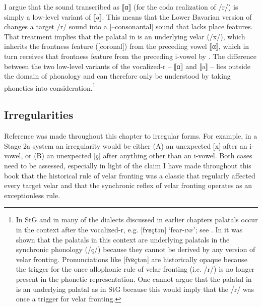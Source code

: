 I argue that the sound transcribed as ⟦α⟧ (for the coda realization of /r/) is simply a low-level variant of ⟦ə⟧. This means that the Lower Bavarian version of  changes a target /r/ sound into a [--consonantal] sound that lacks place features. That treatment implies that the palatal in  is an underlying velar (/x/), which inherits the frontness feature ([coronal]) from the preceding vowel ⟦α⟧, which in turn receives that frontness feature from the preceding i-vowel by . The difference between the two low-level variants of the vocalized-r -- ⟦α⟧ and ⟦ə⟧ -- lies outside the domain of phonology and can therefore only be understood by taking phonetics into consideration.\footnote{{In StG and in many of the dialects discussed in earlier chapters palatals occur in the context after the vocalized-r, e.g. [fʏɐçtən] ‘fear-}\textrm{\textsc{inf}}\textrm{’; see . In  it was shown that the palatals in this context are underlying palatals in the synchronic phonology (/ç/) because they cannot be derived by any version of velar fronting. Pronunciations like [fʏɐçtən] are historically opaque because the trigger for the once allophonic rule of velar fronting (i.e. /r/) is no longer present in the phonetic representation. One cannot argue that the palatal in  is an underlying palatal as in StG because this would imply that the /r/ was once a trigger for velar fronting.}}

\subsection{Irregularities}\label{sec:13.5.3}

Reference was made throughout this chapter to irregular forms. For example, in a Stage 2a system an irregularity would be either (A) an unexpected [x] after an i-vowel, or (B) an unexpected [ç] after anything other than an i-vowel. Both cases need to be assessed, especially in light of the claim I have made throughout this book that the historical rule of velar fronting was a classic  that regularly affected every target velar and that the synchronic reflex of velar fronting operates as an exceptionless rule.

